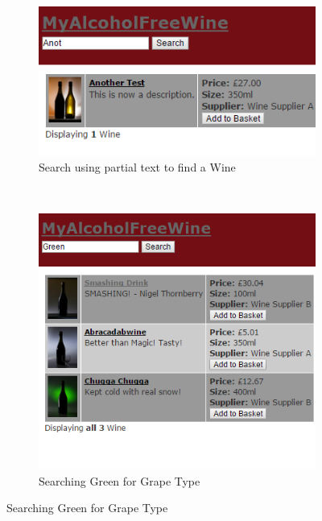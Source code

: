 \documentclass[12pt]{article}
\begin{document}
\begin{figure}[H]
    \centering
    \begin{subfigure}[b]{0.3\textwidth}
        \includegraphics[width=\textwidth]{assets/FR2_screen_1}
        \caption{Search using partial text to find a Wine}
        \label{fig:FR2 partial}
    \end{subfigure}
    ~ %
    \begin{subfigure}[b]{0.3\textwidth}
        \includegraphics[width=\textwidth]{assets/FR2_screen_2}
        \caption{Searching Green for Grape Type}
        \label{fig:FR2 full search}
    \end{subfigure}

\end{figure}
\end{document}
